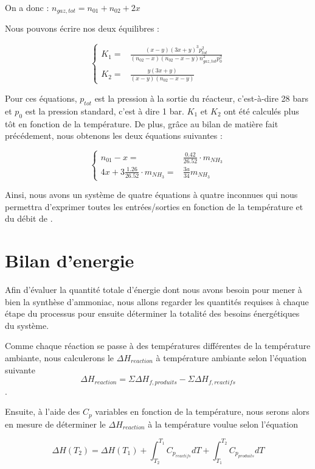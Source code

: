 On a donc : $n_{gaz,tot} = n_{01} + n_{02} + 2x$ 
  
Nous pouvons écrire nos deux équilibres : 
 
$$
	\left\{
		\begin{array}{rl}
			K_1 =& \frac{(x-y)(3x+y)^3p_{tot}^2}{(n_{02}-x)(n_{02}-x-y)n_{gaz,tot}^2p_0^2} \\
			K_2 =& \frac{y(3x+y)}{(x-y)(n_{02}-x-y)}
		\end{array}
	\right.
$$

Pour ces équations, $p_{tot}$ est la pression à la sortie du réacteur, c'est-à-dire 28 bars
et $p_0$ est la pression standard, c'est à dire 1 bar.
$K_1$ et $K_2$ ont été calculés plus tôt en fonction de la température. 
De plus, grâce au bilan de matière fait précédement, nous obtenons les deux équations suivantes :

$$
	\left\{
		\begin{array}{rl}
			n_{01} - x =& \frac{0.42}{26.52} \cdot m_{NH_3} \\
			4x + 3\frac{1.26}{26.52}\cdot m_{NH_3} =& \frac{3a}{34}m_{NH_3}
		\end{array}
	\right.
$$
 
Ainsi, nous avons un système de quatre équations à quatre inconnues qui nous permettra d'exprimer
toutes les entrées/sorties en fonction de la température et du débit de . 
   
\section{Bilan d'energie}
Afin d'évaluer la quantité totale d'énergie dont nous avons besoin pour mener à 
bien la synthèse d'ammoniac, nous allons regarder les quantités requises à chaque 
étape du processus pour ensuite déterminer la totalité des besoins énergétiques du
système.

Comme chaque réaction se passe à des températures différentes de la température ambiante,
nous calculerons le $\Delta H_{reaction}$ à température ambiante selon l'équation suivante 
$$\Delta H_{reaction} = \Sigma \Delta H_{f,produits} - \Sigma \Delta H_{f,reactifs}$$.

Ensuite, à l'aide des $C_{p}$ variables en fonction de la température, nous serons alors en 
mesure de déterminer le $\Delta H_{reaction}$ à la température voulue selon l'équation

$$\Delta H(T_2) = \Delta H(T_{1}) 
+ \int_{T_2}^{T_1} C_{p_{reactifs}} dT + \int_{T_1}^{T_2} C_{p_{produits}} dT$$ 

